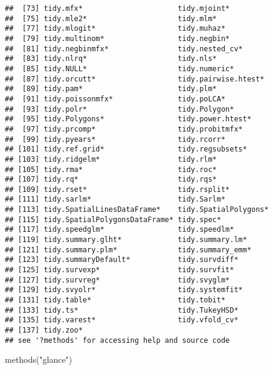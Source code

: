 \documentclass[
]{book}
\newenvironment{Shaded}{\begin{snugshade}}{\end{snugshade}}
\newcommand{\FunctionTok}[1]{\textcolor[rgb]{0.00,0.00,0.00}{#1}}
\newcommand{\NormalTok}[1]{#1}
\newcommand{\StringTok}[1]{\textcolor[rgb]{0.31,0.60,0.02}{#1}}
\begin{document}
\begin{verbatim}
##  [73] tidy.mfx*                      tidy.mjoint*                  
##  [75] tidy.mle2*                     tidy.mlm*                     
##  [77] tidy.mlogit*                   tidy.muhaz*                   
##  [79] tidy.multinom*                 tidy.negbin*                  
##  [81] tidy.negbinmfx*                tidy.nested_cv*               
##  [83] tidy.nlrq*                     tidy.nls*                     
##  [85] tidy.NULL*                     tidy.numeric*                 
##  [87] tidy.orcutt*                   tidy.pairwise.htest*          
##  [89] tidy.pam*                      tidy.plm*                     
##  [91] tidy.poissonmfx*               tidy.poLCA*                   
##  [93] tidy.polr*                     tidy.Polygon*                 
##  [95] tidy.Polygons*                 tidy.power.htest*             
##  [97] tidy.prcomp*                   tidy.probitmfx*               
##  [99] tidy.pyears*                   tidy.rcorr*                   
## [101] tidy.ref.grid*                 tidy.regsubsets*              
## [103] tidy.ridgelm*                  tidy.rlm*                     
## [105] tidy.rma*                      tidy.roc*                     
## [107] tidy.rq*                       tidy.rqs*                     
## [109] tidy.rset*                     tidy.rsplit*                  
## [111] tidy.sarlm*                    tidy.Sarlm*                   
## [113] tidy.SpatialLinesDataFrame*    tidy.SpatialPolygons*         
## [115] tidy.SpatialPolygonsDataFrame* tidy.spec*                    
## [117] tidy.speedglm*                 tidy.speedlm*                 
## [119] tidy.summary.glht*             tidy.summary.lm*              
## [121] tidy.summary.plm*              tidy.summary_emm*             
## [123] tidy.summaryDefault*           tidy.survdiff*                
## [125] tidy.survexp*                  tidy.survfit*                 
## [127] tidy.survreg*                  tidy.svyglm*                  
## [129] tidy.svyolr*                   tidy.systemfit*               
## [131] tidy.table*                    tidy.tobit*                   
## [133] tidy.ts*                       tidy.TukeyHSD*                
## [135] tidy.varest*                   tidy.vfold_cv*                
## [137] tidy.zoo*                     
## see '?methods' for accessing help and source code
\end{verbatim}

\begin{Shaded}
\begin{Highlighting}[]
\FunctionTok{methods}\NormalTok{(}\StringTok{"glance"}\NormalTok{)}
\end{Highlighting}
\end{Shaded}
\end{document}
